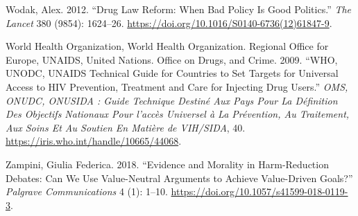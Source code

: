 \documentclass[
  letterpaper,
  DIV=11,
  numbers=noendperiod]{scrartcl}
\newlength{\cslhangindent}
\newenvironment{CSLReferences}[2] %
 {\begin{list}{}{%
  \setlength{\itemindent}{0pt}
  \setlength{\leftmargin}{0pt}
  \setlength{\parsep}{0pt}
  \ifodd #1
   \setlength{\leftmargin}{\cslhangindent}
   \setlength{\itemindent}{-1\cslhangindent}
  \fi
  \setlength{\itemsep}{#2\baselineskip}}}
 {\end{list}}
\begin{document}
\begin{CSLReferences}{1}{0}
Wodak, Alex. 2012. {``Drug Law Reform: When Bad Policy Is Good
Politics.''} \emph{The Lancet} 380 (9854): 1624--26.
\url{https://doi.org/10.1016/S0140-6736(12)61847-9}.

World Health Organization, World Health Organization. Regional Office
for Europe, UNAIDS, United Nations. Office on Drugs, and Crime. 2009.
{``WHO, UNODC, UNAIDS Technical Guide for Countries to Set Targets for
Universal Access to HIV Prevention, Treatment and Care for Injecting
Drug Users.''} \emph{OMS, ONUDC, ONUSIDA : Guide Technique Destiné Aux
Pays Pour La Définition Des Objectifs Nationaux Pour l'accès Universel à
La Prévention, Au Traitement, Aux Soins Et Au Soutien En Matière de
VIH/SIDA}, 40. \url{https://iris.who.int/handle/10665/44068}.

Zampini, Giulia Federica. 2018. {``Evidence and Morality in
Harm-Reduction Debates: Can We Use Value-Neutral Arguments to Achieve
Value-Driven Goals?''} \emph{Palgrave Communications} 4 (1): 1--10.
\url{https://doi.org/10.1057/s41599-018-0119-3}.

\end{CSLReferences}
\end{document}
